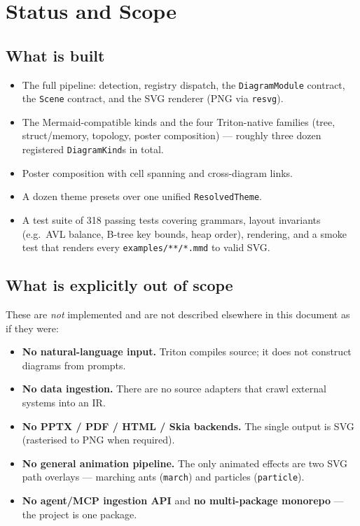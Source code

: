 \section{Status and Scope}
\label{sec:status}

\subsection{What is built}

\begin{itemize}
  \item The full pipeline: detection, registry dispatch, the
        \texttt{DiagramModule} contract, the \texttt{Scene} contract, and the SVG
        renderer (PNG via \texttt{resvg}).
  \item The Mermaid-compatible kinds and the four Triton-native families (tree,
        struct/memory, topology, poster composition) --- roughly three dozen
        registered \texttt{DiagramKind}s in total.
  \item Poster composition with cell spanning and cross-diagram links.
  \item A dozen theme presets over one unified \texttt{ResolvedTheme}.
  \item A test suite of 318 passing tests covering grammars, layout invariants
        (e.g.\ AVL balance, B-tree key bounds, heap order), rendering, and a smoke
        test that renders every \texttt{examples/**/*.mmd} to valid SVG.
\end{itemize}

\subsection{What is explicitly out of scope}

These are \emph{not} implemented and are not described elsewhere in this document
as if they were:

\begin{itemize}
  \item \textbf{No natural-language input.} Triton compiles source; it does not
        construct diagrams from prompts.
  \item \textbf{No data ingestion.} There are no source adapters that crawl
        external systems into an IR.
  \item \textbf{No PPTX / PDF / HTML / Skia backends.} The single output is SVG
        (rasterised to PNG when required).
  \item \textbf{No general animation pipeline.} The only animated effects are two
        SVG path overlays --- marching ants (\texttt{march}) and particles
        (\texttt{particle}).
  \item \textbf{No agent/MCP ingestion API} and \textbf{no multi-package
        monorepo} --- the project is one package.
\end{itemize}

